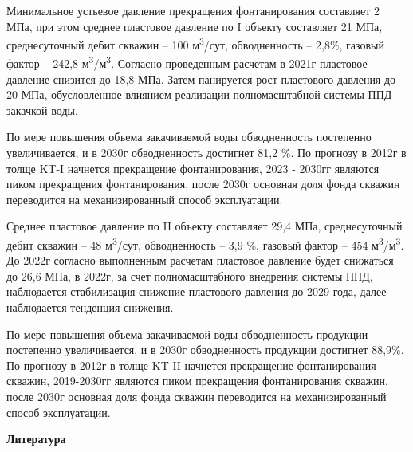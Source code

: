 \begin{multicols}{2}
Минимальное устьевое давление прекращения фонтанирования составляет 2
МПа, при этом среднее пластовое давление по I объекту составляет 21 МПа,
среднесуточный дебит скважин -- 100 м\textsuperscript{3}/сут,
обводненность -- 2,8\%, газовый фактор -- 242,8
м\textsuperscript{3}/м\textsuperscript{3}. Согласно проведенным расчетам
в 2021г пластовое давление снизится до 18,8 МПа. Затем панируется рост
пластового давления до 20 МПа, обусловленное влиянием реализации
полномасштабной системы ППД закачкой воды.

По мере повышения объема закачиваемой воды обводненность постепенно
увеличивается, и в 2030г обводненность достигнет 81,2 \%. По прогнозу в
2012г в толще KT-I начнется прекращение фонтанирования, 2023 - 2030гг
являются пиком прекращения фонтанирования, после 2030г основная доля
фонда скважин переводится на механизированный способ эксплуатации.

Среднее пластовое давление по II объекту составляет 29,4 МПа,
среднесуточный дебит скважин -- 48 м\textsuperscript{3}/сут,
обводненность -- 3,9 \%, газовый фактор -- 454
м\textsuperscript{3}/м\textsuperscript{3}. До 2022г согласно выполненным
расчетам пластовое давление будет снижаться до 26,6 МПа, в 2022г, за
счет полномасштабного внедрения системы ППД, наблюдается стабилизация
снижение пластового давления до 2029 года, далее наблюдается тенденция
снижения.

По мере повышения объема закачиваемой воды обводненность продукции
постепенно увеличивается, и в 2030г обводненность продукции достигнет
88,9\%. По прогнозу в 2012г в толще KT-II начнется прекращение
фонтанирования скважин, 2019-2030гг являются пиком прекращения
фонтанирования скважин, после 2030г основная доля фонда скважин
переводится на механизированный способ эксплуатации.
\end{multicols}

\begin{center}
{\bfseries Литература}
\end{center}

